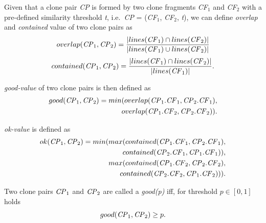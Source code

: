 \documentclass[sigconf,review, anonymous]{acmart}
\newcommand{\squeezeup}{\vspace{-0.5mm}}
\begin{document}
\vspace{0.5ex}
Given that a clone pair \textit{CP} is formed by two clone fragments \textit{CF$_1$} and \textit{CF$_2$} with a pre-defined similarity threshold \textit{t}, i.e.~\textit{CP} = (\textit{CF$_1$}, \textit{CF$_2$}, \textit{t}), we can define \textit{overlap} and \textit{contained} value of two clone pairs as 
\begin{multline}
	overlap(\textrm{\textit{CP}}_1, \textrm{\textit{CP}}_2) = \frac{|lines(\textrm{\textit{CF}}_1) \cap lines(\textrm{\textit{CF}}_2)|}{|lines(\textrm{\textit{CF}}_1) \cup lines(\textrm{\textit{CF}}_2)|} 
\end{multline}
\begin{multline}
	contained(\textrm{\textit{CP}}_1, \textrm{\textit{CP}}_2) = \frac{|lines(\textrm{\textit{CF}}_1) \cap lines(\textrm{\textit{CF}}_2)|}{|lines(\textrm{\textit{CF}}_1)|}. 
\end{multline}

\noindent\textit{good-value} of two clone pairs is then defined as
\begin{align*}
	good(\textrm{\textit{CP}}_1, \textrm{\textit{CP}}_2) = min(overlap(\textrm{\textit{CP}}_1.\textrm{\textit{CF}}_1,\textrm{\textit{CP}}_2.\textrm{\textit{CF}}_1), \\ overlap(\textrm{\textit{CP}}_1.\textrm{\textit{CF}}_2,\textrm{\textit{CP}}_2.\textrm{\textit{CF}}_2)).
\end{align*}

\noindent\textit{ok-value} is defined as
\begin{align*}
	ok(\textrm{\textit{CP}}_1,\textrm{\textit{CP}}_2) = min(max(contained(\textrm{\textit{CP}}_1.\textrm{\textit{CF}}_1,\textrm{\textit{CP}}_2.\textrm{\textit{CF}}_1), \\ contained(\textrm{\textit{CP}}_2.\textrm{\textit{CF}}_1,\textrm{\textit{CP}}_1.\textrm{\textit{CF}}_1)),
	\\ max(contained(\textrm{\textit{CP}}_1.\textrm{\textit{CF}}_2,\textrm{\textit{CP}}_2.\textrm{\textit{CF}}_2), \\contained(\textrm{\textit{CP}}_2.\textrm{\textit{CF}}_2,\textrm{\textit{CP}}_1.\textrm{\textit{CF}}_2))).
\end{align*}

Two clone pairs $\textrm{\textit{CP}}_1$ and $\textrm{\textit{CP}}_2$ are called a \textit{\textit{good}(p)} iff, for threshold $p \in [0,1]$ holds 
\begin{equation}
good(\textrm{\textit{CP}}_1,\textrm{\textit{CP}}_2) \geq p.
\end{equation}
\end{document}
